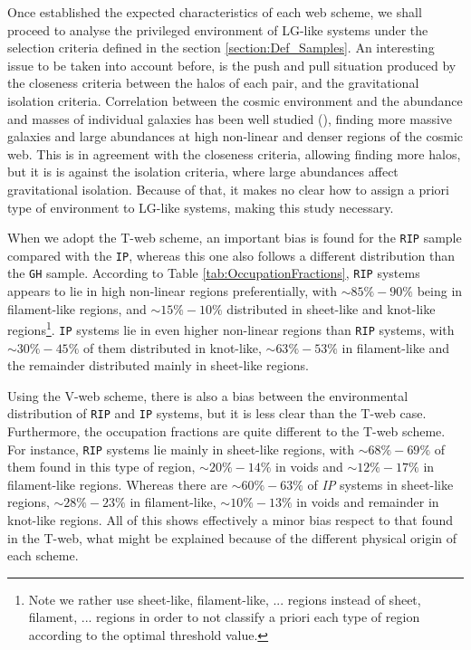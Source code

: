 \documentclass[usenatbib]{latex/mn2e}
\begin{document}
Once established the expected characteristics of each web scheme, we shall 
proceed to analyse the privileged environment of LG-like systems under the
selection criteria defined in the section \ref{section:Def_Samples}. An
interesting issue to be taken into account before, is the push and pull 
situation produced by the closeness criteria between the halos of each 
pair, and the gravitational isolation criteria. Correlation between the 
cosmic environment and the abundance and masses of individual galaxies has 
been well studied (), finding more massive 
galaxies and large abundances at high non-linear and denser regions of the 
cosmic web. This is in agreement with the closeness criteria, allowing 
finding more halos, but it is is against the isolation criteria, where large 
abundances affect gravitational isolation. Because of that, it makes no 
clear how to assign a priori type of environment to LG-like systems, making 
this study necessary.



When we adopt the T-web scheme, an important bias is found for the 
\texttt{RIP} sample compared with the \texttt{IP}, whereas this one 
also follows a different distribution than the \texttt{GH} sample. 
According to Table \ref{tab:OccupationFractions}, \texttt{RIP} systems 
appears to lie in high non-linear regions preferentially, with $\sim 85\%-
90\%$ being in filament-like regions, and $\sim 15\%-10\%$ distributed in 
sheet-like and knot-like regions\footnote{Note we rather use sheet-like, 
filament-like, ... regions instead of sheet, filament, ... regions in 
order to not classify a priori each type of region according to the 
optimal threshold value.}. \texttt{IP} systems lie in even higher 
non-linear regions than \texttt{RIP} systems, with $\sim 30\% - 45\%$ of 
them distributed in knot-like, $\sim 63\% - 53\%$ in filament-like and the 
remainder distributed mainly in sheet-like regions.



Using the V-web scheme, there is also a bias between the environmental 
distribution of \texttt{RIP} and \texttt{IP} systems, but it is less clear
than the T-web case. Furthermore, the occupation fractions are quite 
different to the T-web scheme. For instance, \texttt{RIP} systems lie 
mainly in sheet-like regions, with $\sim 68\% - 69\%$ of them found in 
this type of region, $\sim 20\% - 14\%$ in voids and $\sim 12\% - 
17\%$ in filament-like regions. Whereas there are $\sim 60\% - 63\%$ of
\textit{IP} systems in sheet-like regions, $\sim 28\% - 23\%$ in 
filament-like, $\sim 10\% - 13\%$ in voids and remainder in knot-like
regions. All of this shows effectively a minor bias respect to that found
in the T-web, what might be explained because of the different physical 
origin of each scheme.
\end{document}
